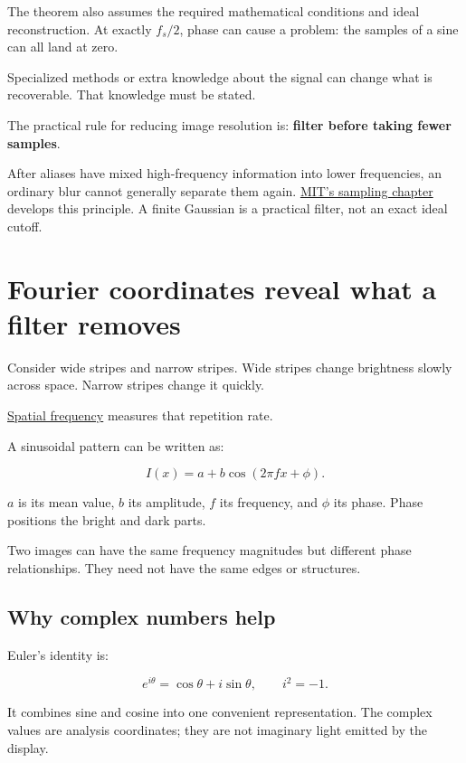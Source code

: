 The theorem also assumes the required mathematical conditions and ideal reconstruction. At exactly \(f_s/2\), phase can cause a problem: the samples of a sine can all land at zero.

Specialized methods or extra knowledge about the signal can change what is recoverable. That knowledge must be stated.

The practical rule for reducing image resolution is: \textbf{filter before taking fewer samples}.

After aliases have mixed high-frequency information into lower frequencies, an ordinary blur cannot generally separate them again. \href{https://visionbook.mit.edu/sampling_and_aliasing.html}{MIT's sampling chapter} develops this principle. A finite Gaussian is a practical filter, not an exact ideal cutoff.

\section{Fourier coordinates reveal what a filter removes}\label{04-visual-computing-ii-ch043-fourier-coordinates-reveal-what-a-filter-removes}

Consider wide stripes and narrow stripes. Wide stripes change brightness slowly across space. Narrow stripes change it quickly.

\hyperref[appendix-b60686ba06a1]{Spatial frequency} measures that repetition rate.

A sinusoidal pattern can be written as:

\[
I(x)=a+b\cos(2\pi fx+\phi).
\]

\(a\) is its mean value, \(b\) its amplitude, \(f\) its frequency, and \(\phi\) its phase. Phase positions the bright and dark parts.

Two images can have the same frequency magnitudes but different phase relationships. They need not have the same edges or structures.

\subsection{Why complex numbers help}\label{04-visual-computing-ii-ch043-why-complex-numbers-help}

Euler's identity is:

\[
e^{i\theta}=\cos\theta+i\sin\theta,\qquad i^2=-1.
\]

It combines sine and cosine into one convenient representation. The complex values are analysis coordinates; they are not imaginary light emitted by the display.

